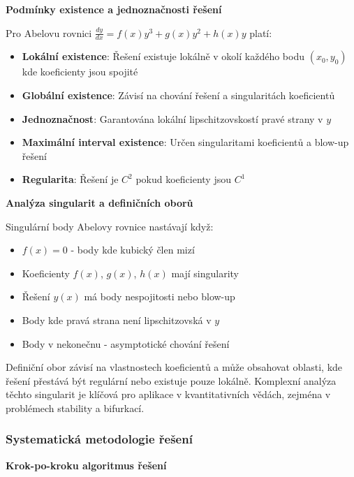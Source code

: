 \vspace{1\baselineskip}

\noindent\textbf{Podmínky existence a jednoznačnosti řešení}

Pro Abelovu rovnici $\frac{dy}{dx} = f(x)y^3 + g(x)y^2 + h(x)y$ platí:
\begin{itemize}
\item \textbf{Lokální existence}: Řešení existuje lokálně v okolí každého bodu $(x_0, y_0)$ kde koeficienty jsou spojité
\item \textbf{Globální existence}: Závisí na chování řešení a singularitách koeficientů
\item \textbf{Jednoznačnost}: Garantována lokální lipschitzovskostí pravé strany v $y$
\item \textbf{Maximální interval existence}: Určen singularitami koeficientů a blow-up řešení
\item \textbf{Regularita}: Řešení je $C^2$ pokud koeficienty jsou $C^1$
\end{itemize}

\vspace{1\baselineskip}

\noindent\textbf{Analýza singularit a definičních oborů}

Singulární body Abelovy rovnice nastávají když:
\begin{itemize}
\item $f(x) = 0$ - body kde kubický člen mizí
\item Koeficienty $f(x)$, $g(x)$, $h(x)$ mají singularity
\item Řešení $y(x)$ má body nespojitosti nebo blow-up
\item Body kde pravá strana není lipschitzovská v $y$
\item Body v nekonečnu - asymptotické chování řešení
\end{itemize}

Definiční obor závisí na vlastnostech koeficientů a může obsahovat oblasti, kde řešení přestává být regulární nebo existuje pouze lokálně. Komplexní analýza těchto singularit je klíčová pro aplikace v kvantitativních vědách, zejména v problémech stability a bifurkací.

\subsubsection{Systematická metodologie řešení}
\label{subsubsec:metodologie-reseni-abel}

\noindent\textbf{Krok-po-kroku algoritmus řešení}

